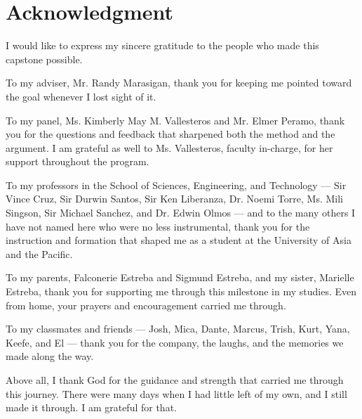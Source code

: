 \clearpage
\section*{Acknowledgment}


I would like to express my sincere gratitude to the people who made this capstone possible.

To my adviser, Mr. Randy Marasigan, thank you for keeping me pointed toward the goal whenever I lost sight of it.

To my panel, Ms. Kimberly May M. Vallesteros and Mr. Elmer Peramo, thank you for the questions and feedback that sharpened both the method and the argument. I am grateful as well to Ms. Vallesteros, faculty in-charge, for her support throughout the program.

To my professors in the School of Sciences, Engineering, and Technology --- Sir Vince Cruz, Sir Durwin Santos, Sir Ken Liberanza, Dr. Noemi Torre, Ms. Mili Singson, Sir Michael Sanchez, and Dr. Edwin Olmos --- and to the many others I have not named here who were no less instrumental, thank you for the instruction and formation that shaped me as a student at the University of Asia and the Pacific.

To my parents, Falconerie Estreba and Sigmund Estreba, and my sister, Marielle Estreba, thank you for supporting me through this milestone in my studies. Even from home, your prayers and encouragement carried me through.

To my classmates and friends --- Josh, Mica, Dante, Marcus, Trish, Kurt, Yana, Keefe, and El --- thank you for the company, the laughs, and the memories we made along the way.

Above all, I thank God for the guidance and strength that carried me through this journey. There were many days when I had little left of my own, and I still made it through. I am grateful for that.
